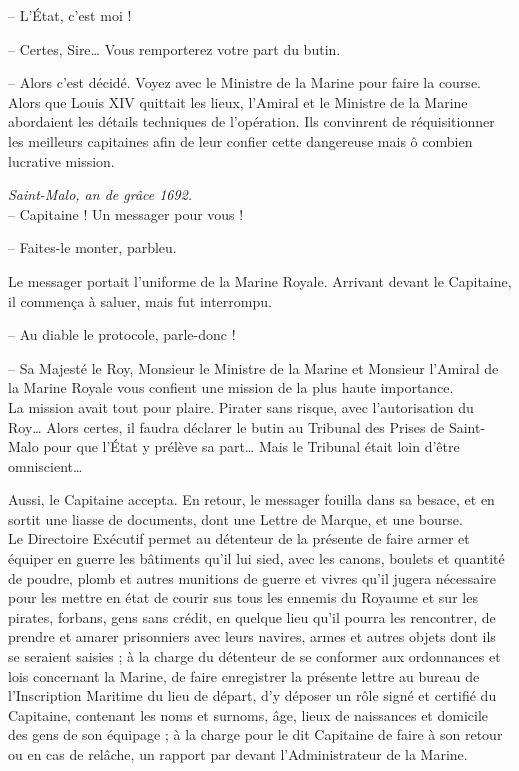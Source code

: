 -- L'État, c'est moi !

-- Certes, Sire\ldots{} Vous remporterez votre part du butin.

-- Alors c'est décidé. Voyez avec le Ministre de la Marine pour faire la course.\\

Alors que Louis XIV quittait les lieux, l'Amiral et le Ministre de la Marine abordaient les détails techniques de l'opération. Ils convinrent de réquisitionner les meilleurs capitaines afin de leur confier cette dangereuse mais ô combien lucrative mission.

\culdelampe{}

\textit{Saint-Malo, an de grâce 1692.}\\

-- Capitaine ! Un messager pour vous !

-- Faites-le monter, parbleu.

Le messager portait l'uniforme de la Marine Royale. Arrivant devant le Capitaine, il commença à saluer, mais fut interrompu.

-- Au diable le protocole, parle-donc !

-- Sa Majesté le Roy, Monsieur le Ministre de la Marine et Monsieur l'Amiral de la Marine Royale vous confient une mission de la plus haute importance.\\

La mission avait tout pour plaire. Pirater sans risque, avec l'autorisation du Roy\ldots{} Alors certes, il faudra déclarer le butin au Tribunal des Prises de Saint-Malo pour que l'État y prélève sa part\ldots{} Mais le Tribunal était loin d'être omniscient\ldots{}

Aussi, le Capitaine accepta. En retour, le messager fouilla dans sa besace, et en sortit une liasse de documents, dont une Lettre de Marque, et une bourse.\\

Le Directoire Exécutif permet au détenteur de la présente de faire armer et équiper en guerre les bâtiments qu'il lui sied, avec les canons, boulets et quantité de poudre, plomb et autres munitions de guerre et vivres qu'il jugera nécessaire pour les mettre en état de courir sus tous les ennemis du Royaume et sur les pirates, forbans, gens sans crédit, en quelque lieu qu'il pourra les rencontrer, de prendre et amarer prisonniers avec leurs navires, armes et autres objets dont ils se seraient saisies ; à la charge du détenteur de se conformer aux ordonnances et lois concernant la Marine, de faire enregistrer la présente lettre au bureau de l'Inscription Maritime du lieu de départ, d'y déposer un rôle signé et certifié du Capitaine, contenant les noms et surnoms, âge, lieux de naissances et domicile des gens de son équipage ; à la charge pour le dit Capitaine de faire à son retour ou en cas de relâche, un rapport par devant l'Administrateur de la Marine.\\

